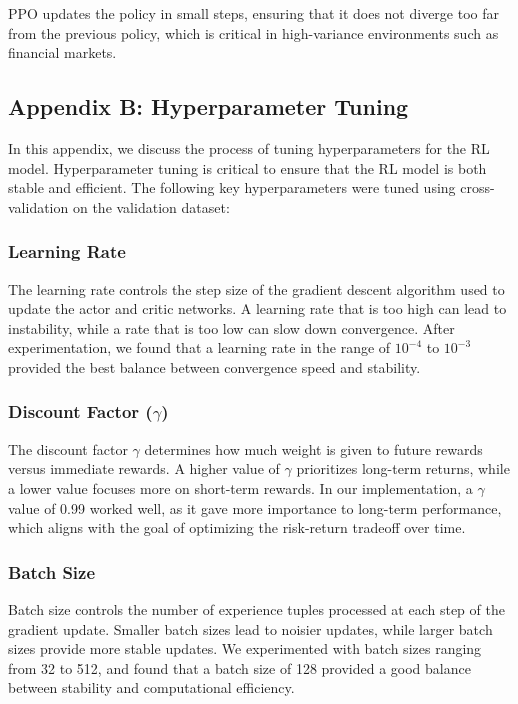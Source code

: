 PPO updates the policy in small steps, ensuring that it does not diverge too far from the previous policy, which is critical in high-variance environments such as financial markets.

\subsection*{Appendix B: Hyperparameter Tuning}

In this appendix, we discuss the process of tuning hyperparameters for the RL model. Hyperparameter tuning is critical to ensure that the RL model is both stable and efficient. The following key hyperparameters were tuned using cross-validation on the validation dataset:

\subsubsection*{Learning Rate}

The learning rate controls the step size of the gradient descent algorithm used to update the actor and critic networks. A learning rate that is too high can lead to instability, while a rate that is too low can slow down convergence. After experimentation, we found that a learning rate in the range of $10^{-4}$ to $10^{-3}$ provided the best balance between convergence speed and stability.

\subsubsection*{Discount Factor ($\gamma$)}

The discount factor $\gamma$ determines how much weight is given to future rewards versus immediate rewards. A higher value of $\gamma$ prioritizes long-term returns, while a lower value focuses more on short-term rewards. In our implementation, a $\gamma$ value of 0.99 worked well, as it gave more importance to long-term performance, which aligns with the goal of optimizing the risk-return tradeoff over time.

\subsubsection*{Batch Size}

Batch size controls the number of experience tuples processed at each step of the gradient update. Smaller batch sizes lead to noisier updates, while larger batch sizes provide more stable updates. We experimented with batch sizes ranging from 32 to 512, and found that a batch size of 128 provided a good balance between stability and computational efficiency.

